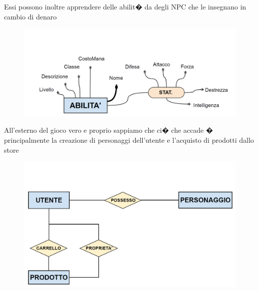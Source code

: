 Essi possono inoltre apprendere delle abilit� da degli NPC che le insegnano in cambio di denaro

\begin{figure}[H]
\centering
\includegraphics[width=0.7\linewidth]{./immagini/ABILITADEF.png}
\end{figure}

All'esterno del gioco vero e proprio sappiamo che ci� che accade � principalmente la creazione di personaggi dell'utente e l'acquisto di prodotti dallo store

\begin{figure}[H]
\centering
\includegraphics[width=0.7\linewidth]{./immagini/utente.png}
\end{figure}

\newpage
